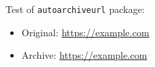 \documentclass{article}
\begin{document}
Test of \texttt{autoarchiveurl} package:

\begin{itemize}
  \item Original: \url{https://example.com}
  \item Archive:  \url{https://example.com}
\end{itemize}
\end{document}
